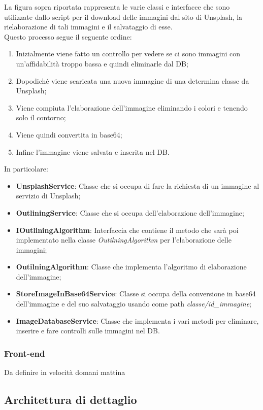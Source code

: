 La figura sopra riportata rappresenta le varie classi e interfacce che sono utilizzate dallo script per il download delle immagini dal sito di Unsplash, la rielaborazione di tali immagini e il salvataggio di esse.\\ Questo processo segue il seguente ordine:
\begin{enumerate}
	\item Inizialmente viene fatto un controllo per vedere se ci sono immagini con un'affidabilità troppo bassa e quindi eliminarle dal DB;
    \item Dopodiché viene scaricata una nuova immagine di una determina classe da Unsplash;
    \item Viene compiuta l'elaborazione dell'immagine eliminando i colori e tenendo solo il contorno;
    \item Viene quindi convertita in base64;
    \item Infine l'immagine viene salvata e inserita nel DB.
\end{enumerate}
\newpage
In particolare:
\begin{itemize}
    \item \textbf{UnsplashService}: Classe che si occupa di fare la richiesta di un immagine al servizio di Unsplash;
    \item \textbf{OutliningService}: Classe che si occupa dell'elaborazione dell'immagine;
    \item \textbf{IOutliningAlgorithm}: Interfaccia che contiene il metodo che sarà poi implementato nella classe \textit{OutilningAlgorithm} per l'elaborazione delle immagini;
    \item \textbf{OutilningAlgorithm}: Classe che implementa l'algoritmo di elaborazione dell'immagine;
    \item \textbf{StoreImageInBase64Service}: Classe si occupa della conversione in base64 dell'immagine e del suo salvataggio usando come path \textit{classe/id\_immagine};
    \item \textbf{ImageDatabaseService}: Classe che implementa i vari metodi per eliminare, inserire e fare controlli sulle immagini nel DB.
\end{itemize}
\newpage
\subsubsection{Front-end}
Da definire in velocità domani mattina
\subsection{Architettura di dettaglio}

